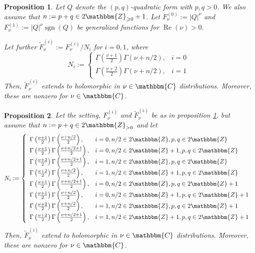 \documentclass{article}
\newcommand{\assign}{:=}
\newcommand{\tmop}[1]{\ensuremath{\operatorname{#1}}}
\numberwithin{definition}{section}
\numberwithin{lemma}{section}
\newtheorem{proposition}{Proposition}
\numberwithin{proposition}{section}
{\theorembodyfont{\rmfamily}\newtheorem{remark}{Remark}
\numberwithin{remark}{section}
}
\begin{document}
\begin{proposition}
  \label{q-norm:prop-1}Let $Q$ denote the $( p, q)$-quadratic form with $p, q
  > 0$. We also assume that $n \assign p + q \in 2\mathbbm{Z}_{\geqslant 0} +
  1$. Let $F^{( 0)}_{\nu} \assign | Q |^{\nu}$ and $F^{( 1)}_{\nu} \assign | Q
  |^{\nu} \tmop{sgn} ( Q)$ be generalized functions for $\tmop{Re} ( \nu) >
  0$.
  
  Let further $\tilde{F}_{\nu}^{( i)} \assign F_{\nu}^{( i)} / N_i$ for $i =
  0, 1$, where
  \[ N_i \assign \left\{ \begin{array}{ll}
       \Gamma \left( \frac{\nu + 1}{2} \right) \Gamma ( \nu + n / 2), & i =
       0\\
       \Gamma \left( \frac{\nu + 2}{2} \right) \Gamma ( \nu + n / 2), & i = 1
     \end{array} \right. \]
  Then, $\tilde{F}_{\nu}^{( i)}$ extends to holomorphic in $\nu \in
  \mathbbm{C}$ distributions. Moreover, these are nonzero for $\nu \in
  \mathbbm{C}$.
\end{proposition}

\begin{proposition}
  \label{q-norm:prop-2}Let the setting, $F_{\nu}^{( i)}$ and
  $\tilde{F}_{\nu}^{( i)}$ be as in proposition \ref{q-norm:prop-1}, but
  assume that $n \assign p + q \in 2\mathbbm{Z}_{> 0}$ and let
  \[ N_i \assign \left\{ \begin{array}{ll}
       \Gamma \left( \frac{\nu + 1}{2} \right) \Gamma \left( \frac{\nu + n /
       2}{2} \right), & i = 0, n / 2 \in 2\mathbbm{Z}, p, q \in 2\mathbbm{Z}\\
       \Gamma \left( \frac{\nu + 1}{2} \right) \Gamma \left( \frac{\nu + n / 2
       + 1}{2} \right), & i = 0, n / 2 \in 2\mathbbm{Z}+ 1, p, q \in
       2\mathbbm{Z}\\
       \Gamma \left( \frac{\nu + 2}{2} \right) \Gamma \left( \frac{\nu + n / 2
       + 1}{2} \right), & i = 1, n / 2 \in 2\mathbbm{Z}, p, q \in
       2\mathbbm{Z}\\
       \Gamma \left( \frac{\nu + 2}{2} \right) \Gamma \left( \frac{\nu + n /
       2}{2} \right), & i = 1, n / 2 \in 2\mathbbm{Z}+ 1, p, q \in
       2\mathbbm{Z}\\
       \Gamma \left( \frac{\nu + 1}{2} \right) \Gamma \left( \frac{\nu + n / 2
       + 1}{2} \right), & i = 0, n / 2 \in 2\mathbbm{Z}, p, q \in
       2\mathbbm{Z}+ 1\\
       \Gamma \left( \frac{\nu + 1}{2} \right) \Gamma \left( \frac{\nu + n /
       2}{2} \right), & i = 0, n / 2 \in 2\mathbbm{Z}+ 1, p, q \in
       2\mathbbm{Z}+ 1\\
       \Gamma \left( \frac{\nu + 2}{2} \right) \Gamma \left( \frac{\nu + n /
       2}{2} \right), & i = 1, n / 2 \in 2\mathbbm{Z}, p, q \in 2\mathbbm{Z}+
       1\\
       \Gamma \left( \frac{\nu + 2}{2} \right) \Gamma \left( \frac{\nu + n / 2
       + 1}{2} \right), & i = 1, n / 2 \in 2\mathbbm{Z}+ 1, p, q \in
       2\mathbbm{Z}+ 1
     \end{array} \right. \]
  Then, $\tilde{F}_{\nu}^{( i)}$ extend to holomorphic in $\nu \in
  \mathbbm{C}$ distributions. Moreover, these are nonzero for $\nu \in
  \mathbbm{C}$.
\end{proposition}
\end{document}
